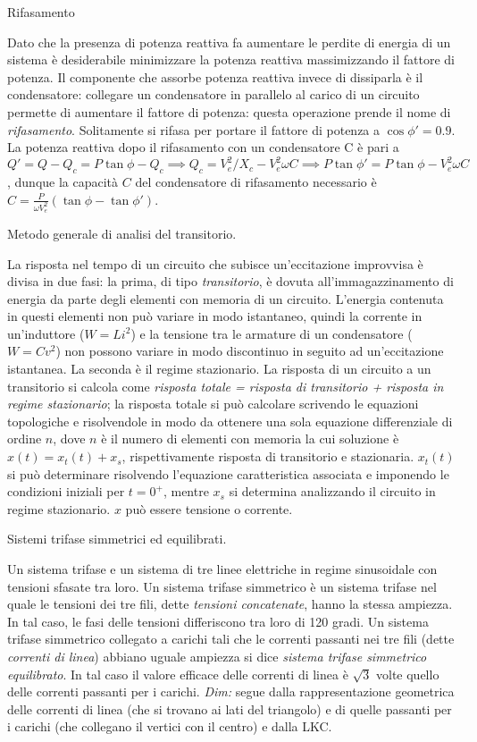 \documentclass[answers, a4paper,12pt]{exam}
\begin{document}
\begin{questions}
	\question
	Rifasamento
	\begin{solution}Dato che la presenza di potenza reattiva fa aumentare le perdite di energia di un sistema è desiderabile minimizzare la potenza reattiva massimizzando il fattore di potenza.  Il componente che assorbe potenza reattiva invece di dissiparla è il condensatore: collegare un condensatore in parallelo al carico di un circuito permette di aumentare il fattore di potenza: questa operazione prende il nome di \textit{rifasamento}. Solitamente si rifasa per portare il fattore di potenza a $\cos \phi' = 0.9$. La potenza reattiva dopo il rifasamento con un condensatore C è pari a $Q' = Q - Q_c = P \tan \phi - Q_c \implies Q_c = V_e^2 / X_c - V_e^2 \omega C \implies P \tan \phi' = P \tan \phi - V_e^2 \omega C$, dunque la capacità $C$ del condensatore di rifasamento necessario è $C = \frac{P}{\omega V_e^2} (\tan \phi - \tan \phi')$. 
	\end{solution}
\question
	Metodo generale di analisi del transitorio.
	\begin{solution}
		La risposta nel tempo di un circuito che subisce un'eccitazione improvvisa è divisa in due fasi: la prima, di tipo \textit{transitorio}, è dovuta all'immagazzinamento di energia da parte degli elementi con memoria di un circuito. L'energia contenuta in questi elementi non può variare in modo istantaneo, quindi la corrente in un'induttore ($W = Li^2$) e la tensione tra le armature di un condensatore ($W = C v^2$) non possono variare in modo discontinuo in seguito ad un'eccitazione istantanea. La seconda è il regime stazionario. La risposta di un circuito a un transitorio si calcola come \textit{risposta totale = risposta di transitorio + risposta in regime stazionario}; la risposta totale si può calcolare scrivendo le equazioni topologiche e risolvendole in modo da ottenere una sola equazione differenziale di ordine $n$, dove $n$ è il numero di elementi con memoria la cui soluzione è $x(t) = x_t(t) + x_s$, rispettivamente risposta di transitorio e stazionaria. $x_t(t)$ si può determinare risolvendo l'equazione caratteristica associata e imponendo le condizioni iniziali per $t = 0^+$, mentre $x_s$ si determina analizzando il circuito in regime stazionario. $x$ può essere tensione o corrente.
	\end{solution}
	\question
	Sistemi trifase simmetrici ed equilibrati.
	\begin{solution}Un sistema trifase e un sistema di tre linee elettriche in regime sinusoidale con tensioni sfasate tra loro. Un sistema trifase simmetrico è un sistema trifase nel quale le tensioni dei tre fili, dette \textit{tensioni concatenate}, hanno la stessa ampiezza. In tal caso, le fasi delle tensioni differiscono tra loro di 120 gradi. Un sistema trifase simmetrico collegato a carichi tali che le correnti passanti nei tre fili (dette \textit{correnti di linea}) abbiano uguale ampiezza si dice \textit{sistema trifase simmetrico equilibrato}. In tal caso il valore efficace delle correnti di linea è $\sqrt{3}$ volte quello delle correnti passanti per i carichi. \textit{Dim:} segue dalla rappresentazione geometrica delle correnti di linea (che si trovano ai lati del triangolo) e di quelle passanti per i carichi (che collegano il vertici con il centro) e dalla LKC.

\end{solution}
\end{questions}
\end{document}
